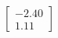 \documentclass[preview]{standalone}
\begin{document}
\begin{align*}
\begin{bmatrix} -2.40 \\ 1.11 \end{bmatrix}
\end{align*}
\end{document}
